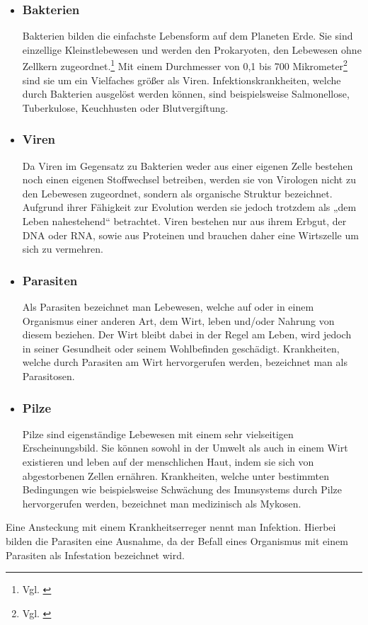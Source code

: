 \documentclass[12pt]{article}
\begin{document}
\begin{itemize}
    \item \subsubsection{Bakterien}
    Bakterien bilden die einfachste Lebensform auf dem Planeten Erde. Sie sind einzellige Kleinstlebewesen und werden den Prokaryoten, den Lebewesen ohne Zellkern zugeordnet.\footnote{Vgl. \cite{Nagel2021}} Mit einem Durchmesser von 0,1 bis 700 Mikrometer\footnote{Vgl. \cite{BZgA2021}} sind sie um ein Vielfaches größer als Viren. Infektionskrankheiten, welche durch Bakterien ausgelöst werden können, sind beispielsweise Salmonellose, Tuberkulose, Keuchhusten oder Blutvergiftung.
    \item \subsubsection{Viren}
    Da Viren im Gegensatz zu Bakterien weder aus einer eigenen Zelle bestehen noch einen eigenen Stoffwechsel betreiben, werden sie von Virologen nicht zu den Lebewesen zugeordnet, sondern als organische Struktur bezeichnet. Aufgrund ihrer Fähigkeit zur Evolution werden sie jedoch trotzdem als „dem Leben nahestehend“ betrachtet. Viren bestehen nur aus ihrem Erbgut, der DNA oder RNA, sowie aus Proteinen und brauchen daher eine Wirtszelle um sich zu vermehren.
    \item \subsubsection{Parasiten}
    Als Parasiten bezeichnet man Lebewesen, welche auf oder in einem Organismus einer anderen Art, dem Wirt, leben und/oder Nahrung von diesem beziehen. Der Wirt bleibt dabei in der Regel am Leben, wird jedoch in seiner Gesundheit oder seinem Wohlbefinden geschädigt. Krankheiten, welche durch Parasiten am Wirt hervorgerufen werden, bezeichnet man als Parasitosen. 
    \item \subsubsection{Pilze}
    Pilze sind eigenständige Lebewesen mit einem sehr vielseitigen Erscheinungsbild. Sie können sowohl in der Umwelt als auch in einem Wirt existieren und leben auf der menschlichen Haut, indem sie sich von abgestorbenen Zellen ernähren. Krankheiten, welche unter bestimmten Bedingungen wie beispielsweise Schwächung des Imunsystems durch Pilze hervorgerufen werden, bezeichnet man medizinisch als Mykosen.
    
\end{itemize}
Eine Ansteckung mit einem Krankheitserreger nennt man Infektion. Hierbei bilden die Parasiten eine Ausnahme, da der Befall eines Organismus mit einem Parasiten als Infestation bezeichnet wird.
\end{document}
